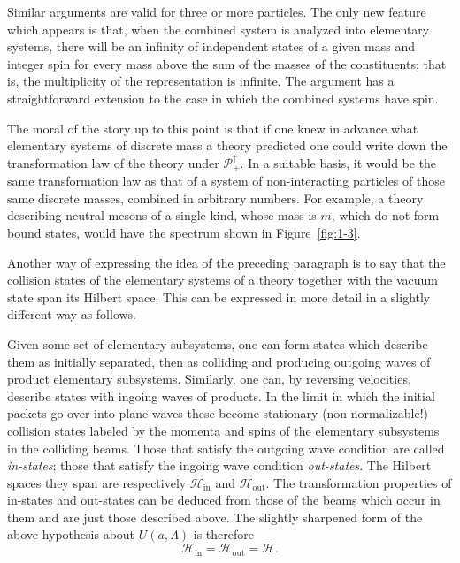 Similar arguments are valid for three or more particles. The only new feature
which appears is that, when the combined system is analyzed into elementary
systems, there will be an infinity of independent states of a given mass and
integer spin for every mass above the sum of the masses of the constituents; that
is, the multiplicity of the representation is infinite. The argument has a
straightforward extension to the case in which the combined systems have spin.

The moral of the story up to this point is that if one knew in advance what
elementary systems of discrete mass a theory predicted one could write down the
transformation law of the theory under $\mathcal{P}^{\uparrow}_{+}$. In a
suitable basis, it would be the same transformation law as that of a system of
non-interacting particles of those same discrete masses, combined in arbitrary
numbers. For example, a theory describing neutral mesons of a single kind,
whose mass is $m$, which do not form bound states, would have the spectrum shown
in Figure~\ref{fig:1-3}.

Another way of expressing the idea of the preceding paragraph is to say that
the collision states of the elementary systems of a theory together with the
vacuum state span its Hilbert space. This can be expressed in more detail in a
slightly different way as follows.

Given some set of elementary subsystems, one can form states which describe them
as initially separated, then as colliding and producing outgoing waves of product
elementary subsystems. Similarly, one can, by reversing velocities, describe
states with ingoing waves of
%
products. In the limit in which the initial packets go over into plane waves
these become stationary (non-normalizable!) collision states labeled by the
momenta and spins of the elementary subsystems in the colliding beams. Those
that satisfy the outgoing wave condition are called \emph{in-states}; those that
satisfy the ingoing wave condition \emph{out-states}. The Hilbert spaces they
span are respectively $\mathcal{H}_{\mathrm{in}}$ and
$\mathcal{H}_{\mathrm{out}}$. The transformation properties of in-states and
out-states can be deduced from those of the beams which occur in them and are
just those described above. The slightly sharpened form of the above hypothesis
about $U(a,\Lambda)$ is therefore
\begin{equation*}
  \mathcal{H}_{\mathrm{in}}=\mathcal{H}_{\mathrm{out}}=\mathcal{H}.
\end{equation*}

